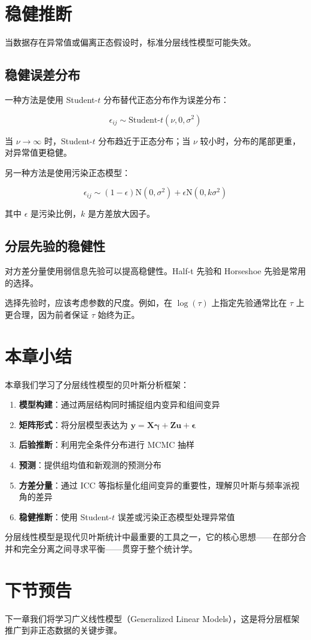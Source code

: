 \section{稳健推断}
\label{sec:robust-inference}

当数据存在异常值或偏离正态假设时，标准分层线性模型可能失效。

\subsection{稳健误差分布}
\label{sec:robust-error}

一种方法是使用 Student-$t$ 分布替代正态分布作为误差分布：

\[
\epsilon_{ij} \sim \text{Student-}t(\nu, 0, \sigma^2)
\]

当 $\nu \to \infty$ 时，Student-$t$ 分布趋近于正态分布；当 $\nu$ 较小时，分布的尾部更重，对异常值更稳健。

另一种方法是使用污染正态模型：

\[
\epsilon_{ij} \sim (1 - \epsilon) \mathrm{N}(0, \sigma^2) + \epsilon \mathrm{N}(0, k\sigma^2)
\]

其中 $\epsilon$ 是污染比例，$k$ 是方差放大因子。

\subsection{分层先验的稳健性}
\label{sec:robust-prior}

对方差分量使用弱信息先验可以提高稳健性。Half-t 先验和 Horseshoe 先验是常用的选择。

\begin{Remark}
选择先验时，应该考虑参数的尺度。例如，在 $\log(\tau)$ 上指定先验通常比在 $\tau$ 上更合理，因为前者保证 $\tau$ 始终为正。
\end{Remark}

\section{本章小结}
\label{sec:ch15-summary}

本章我们学习了分层线性模型的贝叶斯分析框架：

\begin{enumerate}
  \item \textbf{模型构建}：通过两层结构同时捕捉组内变异和组间变异
  \item \textbf{矩阵形式}：将分层模型表达为 $\mathbf{y} = \mathbf{X}\boldsymbol{\gamma} + \mathbf{Z}\mathbf{u} + \boldsymbol{\epsilon}$
  \item \textbf{后验推断}：利用完全条件分布进行 MCMC 抽样
  \item \textbf{预测}：提供组均值和新观测的预测分布
  \item \textbf{方差分量}：通过 ICC 等指标量化组间变异的重要性，理解贝叶斯与频率派视角的差异
  \item \textbf{稳健推断}：使用 Student-$t$ 误差或污染正态模型处理异常值
\end{enumerate}

分层线性模型是现代贝叶斯统计中最重要的工具之一，它的核心思想——在部分合并和完全分离之间寻求平衡——贯穿于整个统计学。

\section{下节预告}
\label{sec:ch15-next}

下一章我们将学习广义线性模型（Generalized Linear Models），这是将分层框架推广到非正态数据的关键步骤。

\endinput
